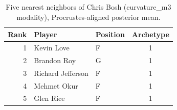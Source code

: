 \begin{table}[htbp]
  \centering\small
  \begin{tabular}{rllc}
    \toprule
    Rank & Player & Position & Archetype \\
    \midrule
    1 & Kevin Love & F & 1 \\
    2 & Brandon Roy & G & 1 \\
    3 & Richard Jefferson & F & 1 \\
    4 & Mehmet Okur & F & 1 \\
    5 & Glen Rice & F & 1 \\
    \bottomrule
  \end{tabular}
  \caption{Five nearest neighbors of Chris Bosh (curvature_m3 modality), Procrustes-aligned posterior mean.}
  \label{tab:Chris_Bosh_neighbors_curvature_m3}
\end{table}

